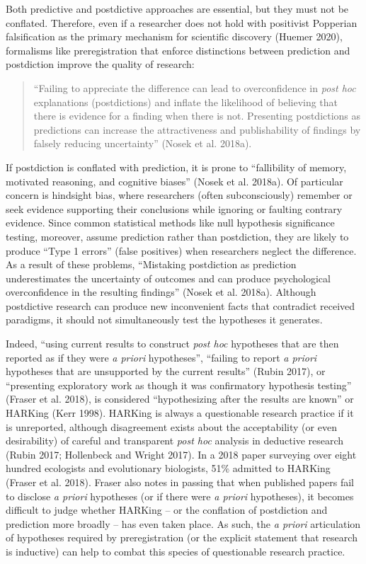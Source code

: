 \documentclass[article]{sa}
\begin{document}
Both predictive and postdictive approaches are essential, but they must
not be conflated. Therefore, even if a researcher does not hold with
positivist Popperian falsification as the primary mechanism for
scientific discovery (Huemer 2020), formalisms like preregistration that
enforce distinctions between prediction and postdiction improve the
quality of research:

\begin{quote}

``Failing to appreciate the difference can lead to overconfidence in
\emph{post hoc} explanations (postdictions) and inflate the likelihood
of believing that there is evidence for a finding when there is not.
Presenting postdictions as predictions can increase the attractiveness
and publishability of findings by falsely reducing uncertainty'' (Nosek
et al. 2018a).

\end{quote}

If postdiction is conflated with prediction, it is prone to ``fallibility
of memory, motivated reasoning, and cognitive biases'' (Nosek et al.
2018a). Of particular concern is hindsight bias, where researchers
(often subconsciously) remember or seek evidence supporting their
conclusions while ignoring or faulting contrary evidence. Since common
statistical methods like null hypothesis significance testing, moreover,
assume prediction rather than postdiction, they are likely to produce
``Type 1 errors'' (false positives) when researchers neglect the
difference. As a result of these problems, ``Mistaking postdiction as
prediction underestimates the uncertainty of outcomes and can produce
psychological overconfidence in the resulting findings'' (Nosek et al.
2018a). Although postdictive research can produce new inconvenient facts
that contradict received paradigms, it should not simultaneously test
the hypotheses it generates.

Indeed, ``using current results to construct \emph{post hoc} hypotheses
that are then reported as if they were \emph{a priori} hypotheses'',
``failing to report \emph{a priori} hypotheses that are unsupported by
the current results'' (Rubin
2017), or ``presenting exploratory work as though it was confirmatory
hypothesis testing'' (Fraser
et al. 2018), is considered ``hypothesizing after the results are known''
or HARKing (Kerr 1998). HARKing is always a questionable research
practice if it is unreported, although disagreement exists about the
acceptability (or even desirability) of careful and transparent
\emph{post hoc} analysis in deductive research (Rubin 2017; Hollenbeck
and Wright 2017). In a 2018 paper surveying over eight hundred
ecologists and evolutionary biologists, 51\% admitted to HARKing (Fraser
et al. 2018). Fraser also notes in passing that when published papers
fail to disclose \emph{a priori} hypotheses (or if there were \emph{a
priori} hypotheses), it becomes difficult to judge whether HARKing --
or the conflation of postdiction and prediction more broadly -- has
even taken place. As such, the \emph{a priori} articulation of
hypotheses required by preregistration (or the explicit statement that
research is inductive) can help to combat this species of questionable
research practice.
\end{document}
